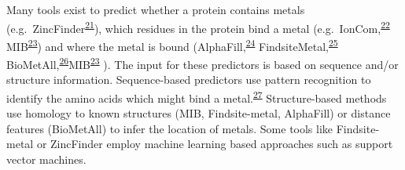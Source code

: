 \documentclass[  ASAPversion,
  ,
  9pt]{elife}
\begin{document}
Many tools exist to predict whether a protein contains metals (e.g.~ZincFinder\textsuperscript{\protect\hyperlink{ref-qNdK0F1w}{21}}), which residues in the protein bind a metal (e.g.~IonCom,\textsuperscript{\protect\hyperlink{ref-KNmKWbrP}{22}} MIB\textsuperscript{\protect\hyperlink{ref-1HMhB3vxM}{23}}) and where the metal is bound (AlphaFill,\textsuperscript{\protect\hyperlink{ref-13fLqNwbD}{24}} FindsiteMetal,\textsuperscript{\protect\hyperlink{ref-W4f7UG1p}{25}} BioMetAll,\textsuperscript{\protect\hyperlink{ref-iHxzzTCG}{26}}MIB\textsuperscript{\protect\hyperlink{ref-1HMhB3vxM}{23}} ). The input for these predictors is based on sequence and/or structure information. Sequence-based predictors use pattern recognition to identify the amino acids which might bind a metal.\textsuperscript{\protect\hyperlink{ref-13sNVOrHB}{27}}
Structure-based methods use homology to known structures (MIB, Findsite-metal, AlphaFill) or distance features (BioMetAll) to infer the location of metals. Some tools like Findsite-metal or ZincFinder employ machine learning based approaches such as support vector machines.
\end{document}
